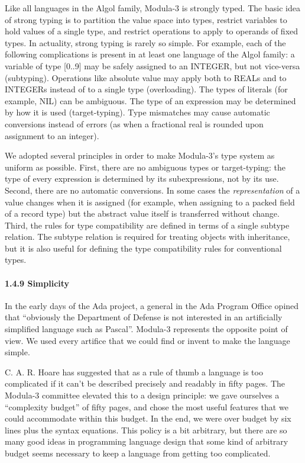 \documentclass[10pt]{article}
\begin{document}
  Like all languages in the Algol family, Modula-3 is strongly typed. The basic idea of strong typing is to partition the value space into types, restrict variables to hold values of a single type, and restrict operations to apply to operands of fixed types. In actuality, strong typing is rarely so simple. For example, each of the following complications is present in at least one language of the Algol family: a variable of type [0..9] may be safely assigned to an INTEGER, but not vice-versa (subtyping). Operations like absolute value may apply both to REALs and to INTEGERs instead of to a single type (overloading). The types of literals (for example, NIL) can be ambiguous. The type of an expression may be determined by how it is used (target-typing). Type mismatches may cause automatic conversions instead of errors (as when a fractional real is rounded upon assignment to an integer). 


  We adopted several principles in order to make Modula-3's type system as uniform as possible. First, there are no ambiguous types or target-typing: the type of every expression is determined by its subexpressions, not by its use. Second, there are no automatic conversions. In some cases the \emph{representation}
 of a value changes when it is assigned (for example, when assigning to a packed field of a record type) but the abstract value itself is transferred without change. Third, the rules for type compatibility are defined in terms of a single subtype relation. The subtype relation is required for treating objects with inheritance, but it is also useful for defining the type compatibility rules for conventional types. 


 
\paragraph{1.4.9 Simplicity}


  In the early days of the Ada project, a general in the Ada Program Office opined that ``obviously the Department of Defense is not interested in an artificially simplified language such as Pascal''. Modula-3 represents the opposite point of view. We used every artifice that we could find or invent to make the language simple. 


  C. A. R. Hoare has suggested that as a rule of thumb a language is too complicated if it can't be described precisely and readably in fifty pages. The Modula-3 committee elevated this to a design principle: we gave ourselves a ``complexity budget'' of fifty pages, and chose the most useful features that we could accommodate within this budget. In the end, we were over budget by six lines plus the syntax equations. This policy is a bit arbitrary, but there are so many good ideas in programming language design that some kind of arbitrary budget seems necessary to keep a language from getting too complicated. 
\end{document}
